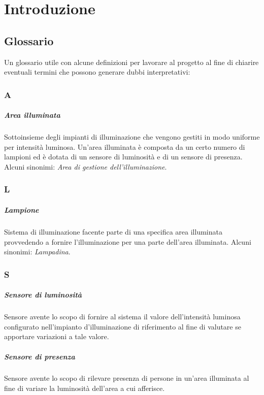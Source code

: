 \chapter{Introduzione}

\section{Glossario}
Un glossario utile con alcune definizioni per lavorare al progetto al fine di chiarire eventuali termini che possono generare dubbi interpretativi:

\subsection*{A}

\paragraph{Area illuminata} Sottoinsieme degli impianti di illuminazione che vengono gestiti in modo uniforme per intensità luminosa. Un'area illuminata è composta da un certo numero di lampioni ed è dotata di un sensore di luminosità e di un sensore di presenza. Alcuni sinonimi: \textit{Area di gestione dell'illuminazione}.

\subsection*{L}
\paragraph{Lampione} Sistema di illuminazione facente parte di una specifica area illuminata provvedendo a fornire l'illuminazione per una parte dell'area illuminata. Alcuni sinonimi: \textit{Lampadina}.

\subsection*{S}
\paragraph{Sensore di luminosità} Sensore avente lo scopo di fornire al sistema il valore dell'intensità luminosa configurato nell'impianto d'illuminazione di riferimento al fine di valutare se apportare variazioni a tale valore.

\paragraph{Sensore di presenza} Sensore avente lo scopo di rilevare presenza di persone in un'area illuminata al fine di variare la luminosità dell'area a cui afferisce.

